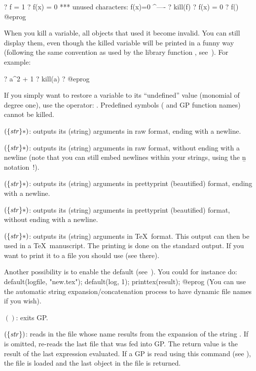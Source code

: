 \bprog
? f = 1
? f(x) = 0
  ***   unused characters: f(x)=0
                            ^----
? kill(f)
? f(x) = 0
? f()
@eprog

  When you kill a variable, all objects that used it become invalid. You
can still display them, even though the killed variable will be printed in a
funny way (following the same convention as used by the library function
, see~). For example:

\bprog
? a^2 + 1
? kill(a)
? %
@eprog

If you simply want to restore a variable to its ``undefined'' value
(monomial of degree one), use the  operator: .
Predefined symbols ( and GP function names) cannot be killed.

$(\{\hbox{\it str\/}\}*)$: outputs its (string) arguments in raw
format, ending with a newline.

$(\{\hbox{\it str\/}\}*)$: outputs its (string) arguments in raw
format, without ending with a newline (note that you can still embed newlines
within your strings, using the \b{n} notation~!).

$(\{\hbox{\it str\/}\}*)$: outputs its (string) arguments in
prettyprint (beautified) format, ending with a newline.

$(\{\hbox{\it str\/}\}*)$: outputs its (string) arguments in
prettyprint (beautified) format, without ending with a newline.

$(\{\hbox{\it str\/}\}*)$: outputs its (string) arguments in
\TeX\ format. This output can then be used in a \TeX\ manuscript.
The printing is done on the standard output. If you want to print it to a
file you should use  (see there).

Another possibility is to enable the  default
(see~).
You could for instance do:
%
\bprog
default(logfile, "new.tex");
default(log, 1);
printtex(result);
@eprog
\noindent
(You can use the automatic string expansion/concatenation process to have
dynamic file names if you wish).

$()$: exits GP.\label{se:quit}

$(\{\hbox{\it str\/}\})$: reads in the file whose name results
from the expansion of the string . If  is omitted,
re-reads the last file that was fed into GP. The return value is the result of
the last expression evaluated.\label{se:read} If a GP  is
read using this command (see ), the file is loaded and
the last object in the file is returned.

